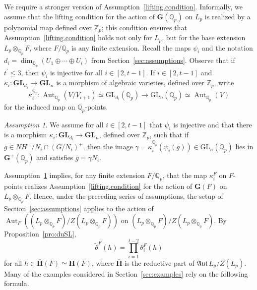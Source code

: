\documentclass[11pt,a4paper]{amsart}
\theoremstyle{plain}
\theoremstyle{remark}
\newtheorem{asm}[thm]{Assumption}
\newcommand{\Z}{\mathbb{Z}}
\newcommand{\Q}{\mathbb{Q}}
\newcommand{\tensor}{\otimes}
\newcommand{\dimL}{n}
\DeclareMathOperator{\Aut}{Aut}
\def \aAut {\mathfrak{Aut} \,}
\begin{document}
We require a stronger version of Assumption~\ref{lifting.condition}.  Informally, 
we assume that the lifting condition for the action of $\mathbf{G}(\Q_p)$ on $L_p$ is realized by a polynomial map defined over $\Z_p$;  
this condition ensures that Assumption~\ref{lifting.condition} holds not only for $L_p$, but for the base extension $L_p \tensor_{\Q_p} F$, where $F / \Q_p$ is any finite extension.
Recall the maps $\psi_i$ and the notation $d_i = \dim_{\Q_p} (U_1 \oplus \cdots \oplus U_i)$ from Section~\ref{sec:assumptions}.  
Observe that if $t^\prime \leq 3$, then $\psi_i$ is injective for all $i \in [2,t-1]$.
If $i \in [2,t-1]$ and $\kappa_i: \mathbf{GL}_{d_i} \to \mathbf{GL}_{\dimL}$ is a morphism of algebraic varieties, defined over $\Z_p$, write 
$$\kappa_i^{\Q_p} :  \Aut_{\Q_p}(V/V_{i+1}) \simeq \mathrm{GL}_{d_i}(\Q_p) \to \mathrm{GL}_{\dimL}(\Q_p) \simeq \Aut_{\Q_p}(V)$$
for the induced map on $\Q_p$-points.  
\begin{asm} \label{polynomial.lifting}
We assume for all $i \in [2,t-1]$ that $\psi_i$ is injective and that there is a morphism $\kappa_i : \mathbf{GL}_{d_i} \to \mathbf{GL}_{\dimL}$, defined over $\Z_p$, such that if $\overline{g} \in NH^+/N_i \cap (G/N_i)^+$, then the image $\gamma = \kappa_i^{\Q_p}(\psi_i(\overline{g})) \in \mathrm{GL}_{\dimL}(\Q_p)$ lies in $\mathbf{G}^+(\Q_p)$ and satisfies $\overline{g} = \gamma N_i$.  
\end{asm}
Assumption~\ref{polynomial.lifting} implies, for any finite extension $F/\Q_p$, that the map $\kappa_i^F$ on $F$-points realizes Assumption~\ref{lifting.condition} for the action of $\mathbf{G}(F)$ on $L_p \tensor_{\Q_p} F$.  Hence, under the preceding series of assumptions, the setup of Section~\ref{sec:assumptions} applies to the action of $\Aut_{F}((L_p \tensor_{\Q_p} F)/Z(L_p \tensor_{\Q_p} F))$ on $(L_p \tensor_{\Q_p} F)/Z(L_p \tensor_{\Q_p} F)$.  By Proposition~\ref{pro:duSL},
\begin{equation} \label{equ:tilde.decomposition}
 \widetilde{\theta}^{F} (h) = \prod_{i = 1}^{t - 2} \theta_i^{F}(h)
 \end{equation}
for all $h \in \overline{\mathbf{H}}(F) \simeq \mathbf{H}(F)$, where $\overline{\mathbf{H}}$ is the reductive part of $\aAut L_p/Z(L_p)$.  Many of the examples considered in Section~\ref{sec:examples} rely on the following formula.  
\end{document}
